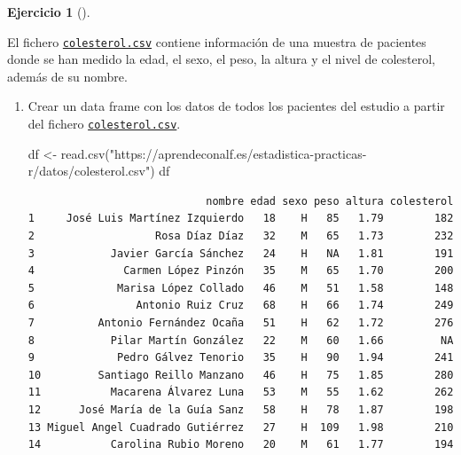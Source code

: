 \documentclass[
  a4paper,
]{scrreport}
\newenvironment{Shaded}{\begin{snugshade}}{\end{snugshade}}
\newcommand{\FunctionTok}[1]{\textcolor[rgb]{0.28,0.35,0.67}{#1}}
\newcommand{\NormalTok}[1]{\textcolor[rgb]{0.00,0.23,0.31}{#1}}
\newcommand{\OtherTok}[1]{\textcolor[rgb]{0.00,0.23,0.31}{#1}}
\newcommand{\StringTok}[1]{\textcolor[rgb]{0.13,0.47,0.30}{#1}}
\theoremstyle{definition}
\newtheorem{exercise}{Ejercicio}[chapter]
\theoremstyle{remark}
\begin{document}
\begin{exercise}[]\protect\hypertarget{exr-descriptiva-2}{}\label{exr-descriptiva-2}

El fichero \href{datos/colesterol.csv}{\texttt{colesterol.csv}} contiene
información de una muestra de pacientes donde se han medido la edad, el
sexo, el peso, la altura y el nivel de colesterol, además de su nombre.

\begin{enumerate}
\def\labelenumi{\alph{enumi}.}
\item
  Crear un data frame con los datos de todos los pacientes del estudio a
  partir del fichero
  \href{datos/colesterol.csv}{\texttt{colesterol.csv}}.

  \begin{tcolorbox}[enhanced jigsaw, breakable, toptitle=1mm, colbacktitle=quarto-callout-tip-color!10!white, rightrule=.15mm, opacityback=0, opacitybacktitle=0.6, titlerule=0mm, coltitle=black, colframe=quarto-callout-tip-color-frame, colback=white, bottomtitle=1mm, leftrule=.75mm, toprule=.15mm, title=\textcolor{quarto-callout-tip-color}{\faLightbulb}\hspace{0.5em}{Solución}, arc=.35mm, bottomrule=.15mm, left=2mm]

\begin{Shaded}
\begin{Highlighting}[]
\NormalTok{df }\OtherTok{\textless{}{-}} \FunctionTok{read.csv}\NormalTok{(}\StringTok{"https://aprendeconalf.es/estadistica{-}practicas{-}r/datos/colesterol.csv"}\NormalTok{)}
\NormalTok{df}
\end{Highlighting}
\end{Shaded}

\begin{verbatim}
                            nombre edad sexo peso altura colesterol
1     José Luis Martínez Izquierdo   18    H   85   1.79        182
2                   Rosa Díaz Díaz   32    M   65   1.73        232
3            Javier García Sánchez   24    H   NA   1.81        191
4              Carmen López Pinzón   35    M   65   1.70        200
5             Marisa López Collado   46    M   51   1.58        148
6                Antonio Ruiz Cruz   68    H   66   1.74        249
7          Antonio Fernández Ocaña   51    H   62   1.72        276
8            Pilar Martín González   22    M   60   1.66         NA
9             Pedro Gálvez Tenorio   35    H   90   1.94        241
10         Santiago Reillo Manzano   46    H   75   1.85        280
11           Macarena Álvarez Luna   53    M   55   1.62        262
12      José María de la Guía Sanz   58    H   78   1.87        198
13 Miguel Angel Cuadrado Gutiérrez   27    H  109   1.98        210
14           Carolina Rubio Moreno   20    M   61   1.77        194
\end{verbatim}


\end{tcolorbox}
\end{enumerate}
\end{exercise}
\end{document}
